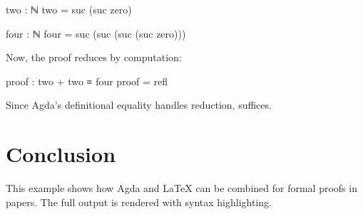 \begin{code}
two : ℕ
two = suc (suc zero)

four : ℕ
four = suc (suc (suc (suc zero)))
\end{code}

Now, the proof reduces by computation:

\begin{code}
proof : two + two ≡ four
proof = refl
\end{code}

Since Agda's definitional equality handles reduction,  suffices.

\section{Conclusion}
This example shows how Agda and LaTeX can be combined for formal proofs in papers. The full output is rendered with syntax highlighting.
